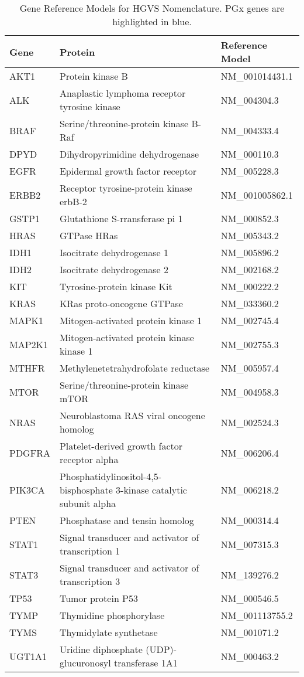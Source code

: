 \normalsize
\begin{table}
    \caption{Gene Reference Models for HGVS Nomenclature. PGx genes are highlighted in blue.}
    \label{tbl:HGVS:gene:model}
    \centering
    \begin{tabular}{ l l l }\toprule
    Gene & Protein & Reference Model \\
    \midrule
    AKT1 & Protein kinase B & NM\_001014431.1 \\
    ALK & Anaplastic lymphoma receptor tyrosine kinase & NM\_004304.3 \\
    BRAF & Serine/threonine-protein kinase B-Raf & NM\_004333.4 \\
    DPYD & Dihydropyrimidine dehydrogenase & NM\_000110.3 \\
    EGFR & Epidermal growth factor receptor & NM\_005228.3 \\
    ERBB2 & Receptor tyrosine-protein kinase erbB-2 & NM\_001005862.1 \\
    GSTP1 & Glutathione S-rransferase pi 1 & NM\_000852.3 \\
    HRAS & GTPase HRas & NM\_005343.2 \\
    IDH1 & Isocitrate dehydrogenase 1 & NM\_005896.2 \\
    IDH2 & Isocitrate dehydrogenase 2 & NM\_002168.2 \\
    KIT & Tyrosine-protein kinase Kit & NM\_000222.2 \\
    KRAS & KRas proto-oncogene GTPase & NM\_033360.2 \\
    MAPK1 & Mitogen-activated protein kinase 1 & NM\_002745.4 \\
    MAP2K1 & Mitogen-activated protein kinase kinase 1 & NM\_002755.3 \\
    MTHFR & Methylenetetrahydrofolate reductase & NM\_005957.4 \\
    MTOR & Serine/threonine-protein kinase mTOR & NM\_004958.3 \\
    NRAS & Neuroblastoma RAS viral oncogene homolog & NM\_002524.3 \\
    PDGFRA & Platelet-derived growth factor receptor alpha & NM\_006206.4 \\
    PIK3CA & Phosphatidylinositol-4,5-bisphosphate 3-kinase catalytic subunit alpha & NM\_006218.2 \\
    PTEN & Phosphatase and tensin homolog & NM\_000314.4 \\
    STAT1 & Signal transducer and activator of transcription 1 & NM\_007315.3 \\
    STAT3 & Signal transducer and activator of transcription 3 & NM\_139276.2 \\
    TP53 & Tumor protein P53 & NM\_000546.5 \\
    TYMP & Thymidine phosphorylase & NM\_001113755.2 \\
    TYMS & Thymidylate synthetase & NM\_001071.2 \\
    UGT1A1 & Uridine diphosphate (UDP)-glucuronosyl transferase 1A1 & NM\_000463.2\\
    \bottomrule
    \end{tabular}
\end{table}
